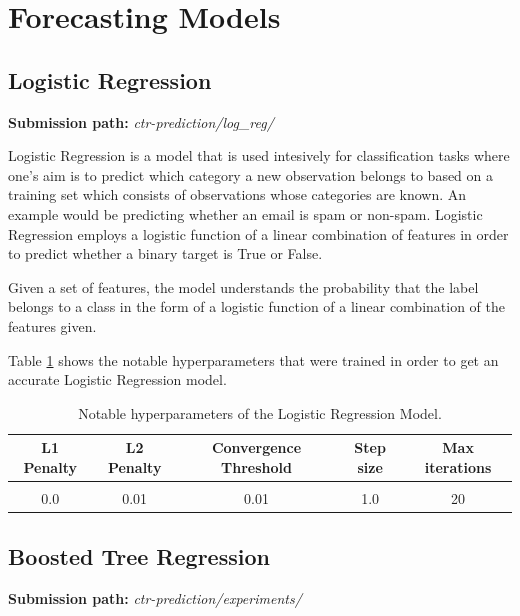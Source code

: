 \documentclass{article} %
\begin{document}
\section{Forecasting Models}

\subsection{Logistic Regression}

\textbf{Submission path:} \textit{ctr-prediction/log\_reg/}

Logistic Regression is a model that is used intesively for classification tasks where one's aim is to predict which category a new observation belongs to based on a training set which consists of observations whose categories are known. An example would be predicting whether an email is spam or non-spam. Logistic Regression employs a logistic function of a linear combination of features in order to predict whether a binary target is True or False.

Given a set of features, the model understands the probability that the label belongs to a class in the form of a logistic function of a linear combination of the features given.

Table \ref{table:17} shows the notable hyperparameters that were trained in order to get an accurate Logistic Regression model.

\begin{table}[!htbp]
\caption{Notable hyperparameters of the Logistic Regression Model.}
\label{table:17}
\begin{center}
\begin{tabular}{c c c c c}
\multicolumn{1}{c}{\bf L1 Penalty} & \multicolumn{1}{c}{\bf L2 Penalty} & \multicolumn{1}{c}{\bf Convergence Threshold} & \multicolumn{1}{c}{\bf Step size} & \multicolumn{1}{c}{\bf Max iterations}
\\ \hline \\
0.0 & 0.01 & 0.01 & 1.0 & 20\\
\end{tabular}
\end{center}
\end{table}

\subsection{Boosted Tree Regression}

\textbf{Submission path:} \textit{ctr-prediction/experiments/}
\end{document}
